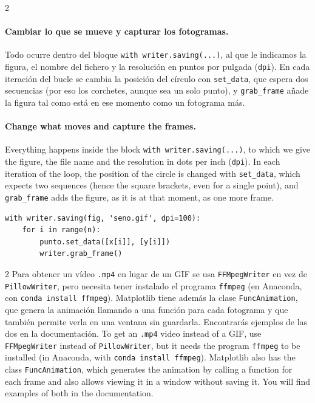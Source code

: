 \begin{paracol}{2}
\paragraph{Cambiar lo que se mueve y capturar los fotogramas.} Todo ocurre dentro del bloque \texttt{with writer.saving(...)}, al que le indicamos la figura, el nombre del fichero y la resolución en puntos por pulgada (\texttt{dpi}). En cada iteración del bucle se cambia la posición del círculo con \texttt{set\_data}, que espera dos secuencias (por eso los corchetes, aunque sea un solo punto), y \texttt{grab\_frame} añade la figura tal como está en ese momento como un fotograma más.
\switchcolumn
\paragraph{Change what moves and capture the frames.} Everything happens inside the block \texttt{with writer.saving(...)}, to which we give the figure, the file name and the resolution in dots per inch (\texttt{dpi}). In each iteration of the loop, the position of the circle is changed with \texttt{set\_data}, which expects two sequences (hence the square brackets, even for a single point), and \texttt{grab\_frame} adds the figure, as it is at that moment, as one more frame.
\end{paracol}
\begin{verbatim}
with writer.saving(fig, 'seno.gif', dpi=100):
    for i in range(n):
        punto.set_data([x[i]], [y[i]])
        writer.grab_frame()
\end{verbatim}
\begin{paracol}{2}
Para obtener un vídeo \texttt{.mp4} en lugar de un GIF se usa \texttt{FFMpegWriter} en vez de \texttt{PillowWriter}, pero necesita tener instalado el programa \texttt{ffmpeg} (en Anaconda, con \texttt{conda install ffmpeg}). Matplotlib tiene además la clase \texttt{FuncAnimation}, que genera la animación llamando a una función para cada fotograma y que también permite verla en una ventana sin guardarla. Encontrarás ejemplos de las dos en la documentación.
\switchcolumn
To get an \texttt{.mp4} video instead of a GIF, use \texttt{FFMpegWriter} instead of \texttt{PillowWriter}, but it needs the program \texttt{ffmpeg} to be installed (in Anaconda, with \texttt{conda install ffmpeg}). Matplotlib also has the class \texttt{FuncAnimation}, which generates the animation by calling a function for each frame and also allows viewing it in a window without saving it. You will find examples of both in the documentation.
\end{paracol}

